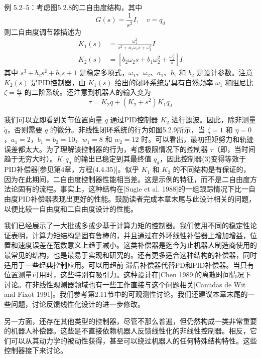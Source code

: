 \documentclass[UTF8,12pt,a4paper]{ctexart}
\begin{document}
\begin{example}[动态二自由度设计]
例 5.2--5：考虑图5.2.8的二自由度结构，其中
\begin{equation}
G(s) = \frac{1}{s^2}I, \quad v = q_d
\end{equation}
则二自由度调节器描述为
\begin{align}
K_1(s) &= \frac{\omega_1^2}{s^2 + a_1\omega_1 s + \omega_1^2}I \\
K_2(s) &= \left[b_2\omega_2 s + b_1\omega_2^2 + \frac{\omega_2^3}{s}\right]I
\end{align}
其中 $s^3+b_2s^2+b_1s+1$ 是稳定多项式，$\omega_1$、$\omega_2$、$a_1$、$b_1$ 和 $b_2$ 是设计参数。注意 $K_2(s)$ 是PID控制器，由 $K_1(s)$ 给出的闭环系统是具有自然频率 $\omega_1$ 和阻尼比 $\zeta = \frac{a_1}{2}$ 的二阶系统。还注意到机器人的输入变为
\begin{equation}
\tau = K_2q + (K_2 + s^2)K_1q_d
\end{equation}

我们可以立即看到关节位置向量 $q$ 通过PID控制器 $K_2$ 进行滤波。因此，除非测量 $\dot{q}$，否则需要 $q$ 的微分。非线性闭环系统的行为如图5.2.9所示，当 $\zeta = 1$ 和 $\eta = 0$，$a_1 = 2$，$b_1 = b_2 = 10$，$w_1 = 8$ 和 $w_2 = 12$ 时。可以看出，最初扭矩努力和轨迹误差都太大。为了理解该控制器的行为，考虑极限情况下的控制器 $\tau$（即，当时间趋于无穷大时）。$K_1q_d$ 的输出已稳定到其最终值 $q_d$，因此控制器(3)变得等效于PID补偿器[参见第4章，方程(4.4.35)]。似乎 $K_1$ 和 $K_2$ 的不同结构是有保证的，因为在此期间，二自由度控制器性能相当差。这是示例的特征，而不是二自由度方法论固有的流程。事实上，这种结构在[Sugie et al. 1988]的一组跟踪情况下比一自由度PID补偿器表现出更好的性能。鼓励读者完成本章末尾与此设计相关的问题，以便比较一自由度和二自由度设计的性能。
\end{example}

我们已经展示了一大批或多或少基于计算力矩的控制器。我们使用不同的稳定性论证表明，计算力矩结构是固有鲁棒的，并且通过在外环线性补偿器上增加增益，位置和速度误差在范数意义上趋于减小。这类补偿器是迄今为止机器人制造商使用的最常见的结构，也是最易于实现和研究的。还有更多适合这种结构的补偿器，同时适用于一些经典控制应用。可以用超前-滞后补偿器代替PD和PID补偿器。当只有位置测量可用时，这些特别有吸引力。这种设计在[Chen 1989]的离散时间情况下讨论。在非线性观测器领域也有一些工作直接与这个问题相关[Canudas de Wit and Fixot 1991]。我们参考第2.11节中的可观测性讨论。我们还建议本章末尾的一些问题，讨论反馈线性化设计的进一步修改。

另一方面，还存在其他类型的控制器，尽管不那么普遍，但仍然构成一类非常重要的机器人补偿器。这些是不直接依赖机器人反馈线性化的非线性控制器。相反，它们可以从其动力学的被动性获得，甚至可以绕过机器人的任何特殊结构特性。这些控制器接下来讨论。
\end{document}
